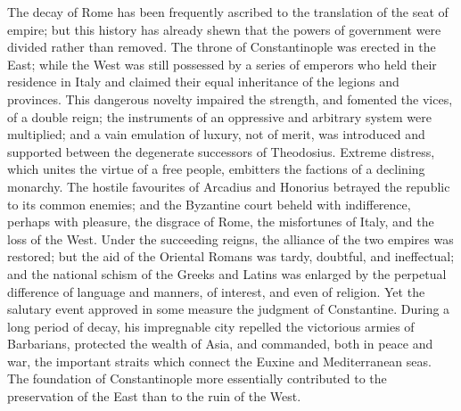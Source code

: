 The decay of Rome has been frequently ascribed to the translation of the seat of empire; but this history has already shewn that the powers of government were divided rather than removed. The throne of Constantinople was erected in the East; while the West was still possessed by a series of emperors who held their residence in Italy and claimed their equal inheritance of the legions and provinces. This dangerous novelty impaired the strength, and fomented the vices, of a double reign; the instruments of an oppressive and arbitrary system were multiplied; and a vain emulation of luxury, not of merit, was introduced and supported between the degenerate successors of Theodosius. Extreme distress, which unites the virtue of a free people, embitters the factions of a declining monarchy. The hostile favourites of Arcadius and Honorius betrayed the republic to its common enemies; and the Byzantine court beheld with indifference, perhaps with pleasure, the disgrace of Rome, the misfortunes of Italy, and the loss of the West. Under the succeeding reigns, the alliance of the two empires was restored; but the aid of the Oriental Romans was tardy, doubtful, and ineffectual; and the national schism of the Greeks and Latins was enlarged by the perpetual difference of language and manners, of interest, and even of religion. Yet the salutary event approved in some measure the judgment of Constantine. During a long period of decay, his impregnable city repelled the victorious armies of Barbarians, protected the wealth of Asia, and commanded, both in peace and war, the important straits which connect the Euxine and Mediterranean seas. The foundation of Constantinople more essentially contributed to the preservation of the East than to the ruin of the West.

